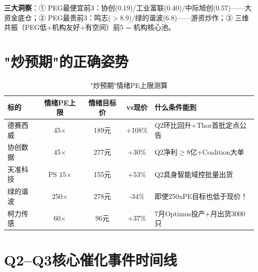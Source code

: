 \textbf{三大洞察}：① PEG最便宜前3：协创(0.19)/工业富联(0.40)/中际旭创(0.57)——大资金底仓；② PEG最贵前3：鸣志($>$8.9)/绿的谐波(6.8)——游资炒作；③ 三维共振（PEG低+机构友好+有空间）前5 = 机构核心池。

\section{"炒预期"的正确姿势}

\begin{table}[H]
\centering\scriptsize
\renewcommand{\arraystretch}{1.15}
\begin{tabularx}{\textwidth}{l c c c X}
\toprule
\textbf{标的} & \textbf{情绪PE上限} & \textbf{情绪目标价} & \textbf{vs现价} & \textbf{什么条件能到} \\
\midrule
德赛西威 & 45$\times$ & 189元 & +108\% & Q2环比回升+Thor首批定点公告 \\
协创数据 & 45$\times$ & 277元 & +30\% & Q2净利$\geq$8亿+Coalition大单 \\
天准科技 & PS 15$\times$ & 155元 & +53\% & Q2具身智能域控批量出货 \\
绿的谐波 & 250$\times$ & 278元 & \textcolor{riskred}{-34\%} & 即使250xPE目标也低于现价！ \\
柯力传感 & 60$\times$ & 96元 & +37\% & 7月Optimus投产+月出货3000只 \\
\bottomrule
\end{tabularx}
\caption{"炒预期"情绪PE上限测算}
\end{table}

\section{Q2--Q3核心催化事件时间线}

